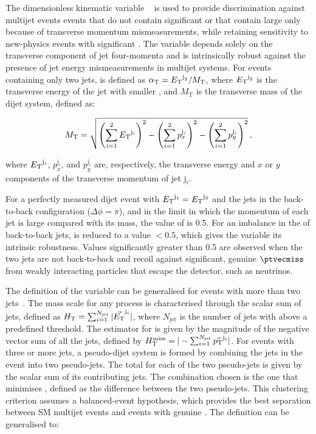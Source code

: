 The dimensionless kinematic variable \alphat~\cite{Randall:2008rw,
  RA1Paper} is used to provide discrimination against multijet events
events that do not contain significant \ptvecmiss or that contain
large \ptvecmiss only because of transverse momentum mismeasurements,
while retaining sensitivity to new-physics events with significant
\ptvecmiss. The \alphat variable depends solely on the transverse
component of jet four-momenta
and is intrinsically robust against the presence of jet energy
mismeasurements in multijet systems. For events containing only two
jets, \alphat is defined as $\alpha_{\text{T}} = {E_{\text T}}^{\text j_2}/M_\text{T}$,
where ${E_{\text T}}^{\text j_2}$ is the transverse energy of the jet with
smaller \Et, and $M_\text{T}$ is the transverse mass of the dijet
system, defined as:

\begin{equation}
  \label{eq:mt}
  M_\text{T} = \sqrt{ \left( \sum_{i=1}^2 {E_{\text T}}^{\mathrm{j}_i}
    \right)^2 - \left( \sum_{i=1}^2 p_x^{\mathrm{j}_i} \right)^2 - \left(
      \sum_{i=1}^2 p_y^{\mathrm{j}_i} \right)^2}\, ,
\end{equation}

where ${E_{\text T}}^{\mathrm{j}_i}$, $p_x^{\mathrm{j}_i}$, and
$p_y^{\mathrm{j}_i}$ are, respectively, the transverse energy and $x$
or $y$ components of the transverse momentum of jet $\mathrm{j}_i$.

For a perfectly measured dijet event with ${E_{\text T}}^{\mathrm{j}_1} =
{E_{\text T}}^{\mathrm{j}_2}$ and the jets in the back-to-back configuration
($\Delta\phi = \pi$), and in the limit in which the momentum of each
jet is large compared with its mass, the value of \alphat is 0.5. For
an imbalance in the \Et of back-to-back jets, \alphat is reduced to a
value $<0.5$, which gives the variable its intrinsic
robustness. Values significantly greater than 0.5 are observed when
the two jets are not back-to-back and recoil against significant,
genuine $\ptvecmiss$ from weakly interacting particles that escape the
detector, such as neutrinos.

The definition of the \alphat variable can be generalised for events
with more than two jets~\cite{RA1Paper}. The mass scale for any
process is characterised through the scalar \Et sum of jets, defined
as $H_{\mathrm{T}} = \sum_{i=1}^{N_\text{jet}} |\vec{{E_{\text T}}}^{\mathrm{j}_i}|$,
where $N_\text{jet}$ is the number of jets with \Et above a predefined
threshold. The estimator for \ptvecmiss is given by the magnitude of
the negative vector \Pt sum of all the jets, defined by $H_{\text{T}}^{\text{miss}} =
|-\sum_{i=1}^{N_\text{jet}} \vec{{p_{\text T}}}^{\mathrm{j}_i}|$. For events
with three or more jets, a pseudo-dijet system is formed by combining
the jets in the event into two pseudo-jets. The total \scalht for each
of the two pseudo-jets is given by the scalar \Et sum of its
contributing jets. The combination chosen is the one that minimises
\dht, defined as the difference between the two pseudo-jets. This
clustering criterion assumes a balanced-event hypothesis, which
provides the best separation between SM multijet events and events
with genuine \ptvecmiss. The \alphat definition can be generalised to:

